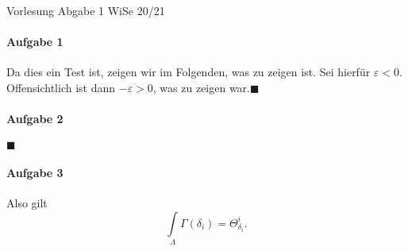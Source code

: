 \documentclass[a4paper]{article}
\begin{document}
\renewcommand{\rmdefault}{\sfdefault}
\newcommand{\quoderat}{\hfill$\blacksquare$}
\setlength{\parindent}{0pt}
\pagestyle{fancy}
\lhead
  {
  Vorlesung}
\chead
  {
  \Large Abgabe 1}
\rhead
  {
  WiSe 20/21}
\paragraph{Aufgabe 1} Da dies ein Test ist, zeigen wir im Folgenden, was zu zeigen ist. Sei hierfür $\varepsilon < 0$.
Offensichtlich ist dann $-\varepsilon > 0$, was zu zeigen war.\quoderat
\paragraph{Aufgabe 2} \blindtext\quoderat
\paragraph{Aufgabe 3} \blindtext
Also gilt
\[\int\limits_\Lambda \Gamma(\delta_i)=\Theta^i_{\delta_i}.\]
\blindtext
\cfoot
  {
  \hphantom{X}}
\rfoot
  {\thepage}
\end{document}
